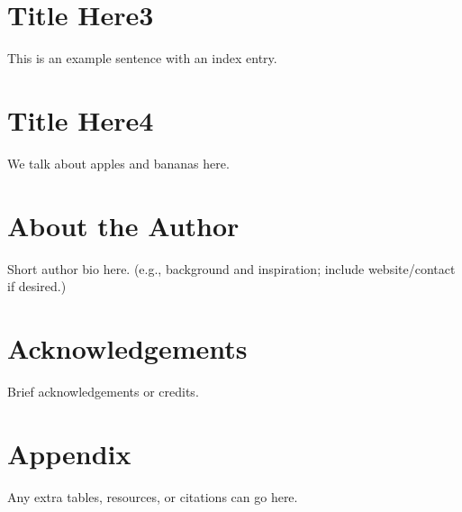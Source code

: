 \documentclass[10pt]{book}
\begin{document}
\lipsum[1]  %




\chapter{Title Here3}
This is an example sentence with an index entry.

\chapter{Title Here4}
We talk about apples and bananas here.



\backmatter

\chapter*{About the Author}
Short author bio here. (e.g., background and inspiration; include website/contact if desired.)

\lipsum[1]  %

\chapter*{Acknowledgements}
Brief acknowledgements or credits.

\lipsum[1]  %

\chapter*{Appendix}
Any extra tables, resources, or citations can go here.

\lipsum[1]  %








\printindex
\end{document}
